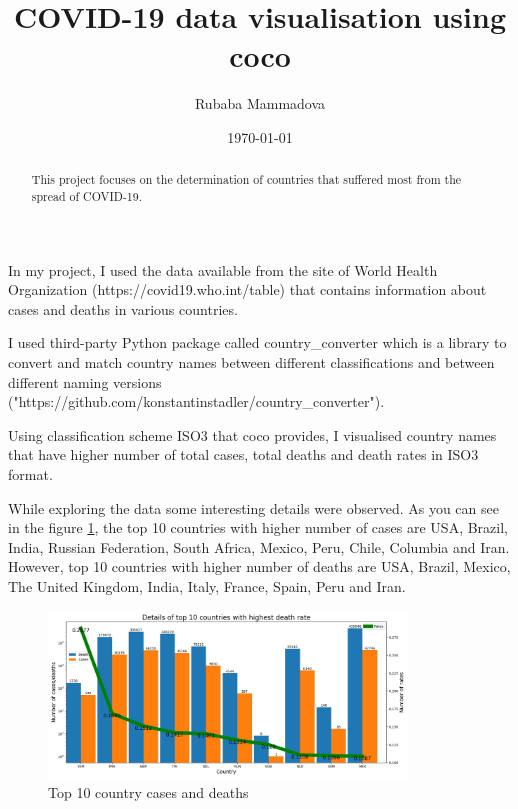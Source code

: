 \documentclass[12pt, letterpaper]{article}
\title{COVID-19 data visualisation using coco}
\author{Rubaba Mammadova}
\date{\today}
\begin{document}
\maketitle

\begin{abstract}
This project focuses on the determination of countries that suffered most from the spread of COVID-19. 
\end{abstract}
In my project, I used the data available from the site of World Health Organization (https://covid19.who.int/table) that contains information about cases and deaths in various countries.

I used third-party Python package called country\_converter which is a library to convert and match country names between different classifications and between different naming versions ("https://github.com/konstantinstadler/country\_converter").

Using classification scheme ISO3 that coco provides, I visualised country names that have higher number of total cases, total deaths and death rates in ISO3 format.

While exploring the data some interesting details were observed. As you can see in the figure \ref{fig:plot1}, the top 10 countries with higher number of cases are USA, Brazil, India, Russian Federation, South Africa, Mexico, Peru, Chile, Columbia and Iran. However, top 10 countries with higher number of deaths are USA, Brazil, Mexico, The United Kingdom, India, Italy, France, Spain, Peru and Iran.

 \begin{figure}[h]
    \centering
    \includegraphics[width=0.85\textwidth]{plot1}
    \caption{Top 10 country cases and deaths}
    \label{fig:plot1}
\end{figure}
\end{document}
